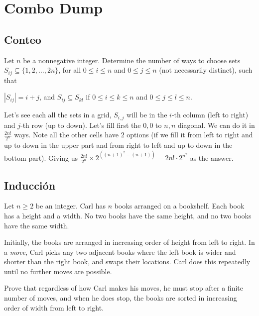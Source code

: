 \chapter{Combo Dump}

\section{Conteo}

\begin{problem}
  Let $n$ be a nonnegative integer.
  Determine the number of ways to choose sets
  $S_{ij} \subseteq \{1, 2, \dots, 2n\}$,
  for all $0 \le i \le n$ and $0 \le j \le n$
  (not necessarily distinct), such that
  \begin{itemize}
  \ii $|S_{ij}| = i+j$, and
  \ii $S_{ij} \subseteq S_{kl}$ if $0 \le i \le k \le n$
  and $0 \le j \le l \le n$.
  \end{itemize}
\end{problem}

Let's see each all the sets in a grid, $S_{i,j}$ will be in 
the $i$-th column (left to right) and $j$-th row (up to down). 
Let's fill first the $0,0$ to $n,n$ diagonal. We can do it 
in $\frac{2n!}{2^n}$ ways. Note all the other cells have 
$2$ options (if we fill it from left to right and up to down
in the upper part and from right to left and up to down in the 
bottom part). Giving us $\frac{2n!}{2^n} \times 
2^{((n+1)^2-(n+1))} = 2n!\cdot 2^{n^2}$ as the answer.

\section{Inducción} 
\begin{problem}
  Let $n \ge 2$ be an integer.
  Carl has $n$ books arranged on a bookshelf.
  Each book has a height and a width.
  No two books have the same height,
  and no two books have the same width.

  Initially, the books are arranged in
  increasing order of height from left to right.
  In a \emph{move}, Carl picks any two adjacent books
  where the left book is wider and shorter than the right book,
  and swaps their locations.
  Carl does this repeatedly until no further moves are possible.

  Prove that regardless of how Carl makes his moves,
  he must stop after a finite number of moves, and when he does stop,
  the books are sorted in increasing order of width from left to right.
\end{problem}

